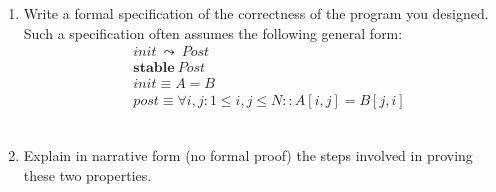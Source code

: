 \documentclass{article}
\begin{document}
\begin{enumerate}
\iffalse
&\langle \ || \ i,j : 1\leq i,j< (p+1) \ :: A[i,j]:=B[j,i] \ \rangle \\
&||\\
&\langle \ || \ i,j : (q-1) < i,j \leq N \ :: A[i,j]:=B[j,i] \ \rangle \\
\fi

\item
Write a formal specification of the correctness of the program you designed. Such a specification often assumes the following general form:\\
\begin{align*}
&init \ \leadsto \ Post\\
&\textbf{stable} \ Post\\
&init \equiv A=B\\
&post \equiv \forall i,j : 1\leq i,j \leq N :: A[i,j]=B[j,i]
\end{align*}
\\
\item
Explain in narrative form (no formal proof) the steps involved in proving these two properties.\\
\end{enumerate}
\end{document}
